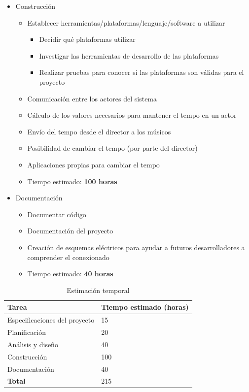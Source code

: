 \begin{itemize}
  \item Construcción
  \begin{itemize}
    \item{Establecer herramientas/plataformas/lenguaje/software a utilizar}
      \begin{itemize}
        \item{Decidir qué plataformas utilizar}
        \item{Investigar las herramientas de desarrollo de las plataformas}
        \item{Realizar pruebas para conocer si las plataformas son válidas para el proyecto}
      \end{itemize}
    \item{Comunicación entre los actores del sistema}
    \item{Cálculo de los valores necesarios para mantener el tempo en un actor}
    \item{Envío del tempo desde el director a los músicos}
    \item{Posibilidad de cambiar el tempo (por parte del director)}
    \item{Aplicaciones propias para cambiar el tempo}
    \item{Tiempo estimado: \textbf{100 horas}}
  \end{itemize}
\end{itemize}

\begin{itemize}
  \item Documentación
  \begin{itemize}
    \item{Documentar código}
    \item{Documentación del proyecto}
    \item{Creación de esquemas eléctricos para ayudar a futuros desarrolladores
    a comprender el conexionado}
    \item{Tiempo estimado: \textbf{40 horas}}
  \end{itemize}
\end{itemize}

\begin{table}[h]
\centering
\label{table:estimadobruto}
\begin{tabular}{ll}
\hline
\rowcolor[HTML]{9698ED}
{\bf Tarea}                   & {\bf Tiempo estimado (horas)} \\ \hline
Especificaciones del proyecto & 15                            \\
Planificación                 & 20                            \\
Análisis y diseño             & 40                            \\
Construcción                  & 100                           \\
Documentación                 & 40                            \\
\rowcolor[HTML]{CBCEFB}
{\bf Total}                   & 215                           \\ \hline
\end{tabular}
\caption{Estimación temporal}
\end{table}


